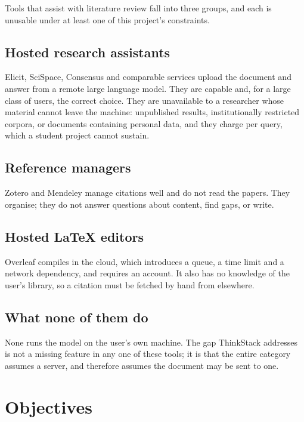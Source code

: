\documentclass[12pt,a4paper]{report}
\begin{document}
Tools that assist with literature review fall into three groups, and each is
unusable under at least one of this project's constraints.

\subsection{Hosted research assistants}

Elicit, SciSpace, Consensus and comparable services upload the document and
answer from a remote large language model. They are capable and, for a large
class of users, the correct choice. They are unavailable to a researcher whose
material cannot leave the machine: unpublished results, institutionally
restricted corpora, or documents containing personal data, and they charge
per query, which a student project cannot sustain.

\subsection{Reference managers}

Zotero and Mendeley manage citations well and do not read the papers. They
organise; they do not answer questions about content, find gaps, or write.

\subsection{Hosted \LaTeX{} editors}

Overleaf compiles in the cloud, which introduces a queue, a time limit and a
network dependency, and requires an account. It also has no knowledge of the
user's library, so a citation must be fetched by hand from elsewhere.

\subsection{What none of them do}

None runs the model on the user's own machine. The gap ThinkStack addresses is
not a missing feature in any one of these tools; it is that the entire category
assumes a server, and therefore assumes the document may be sent to one.

\section{Objectives}
\end{document}
